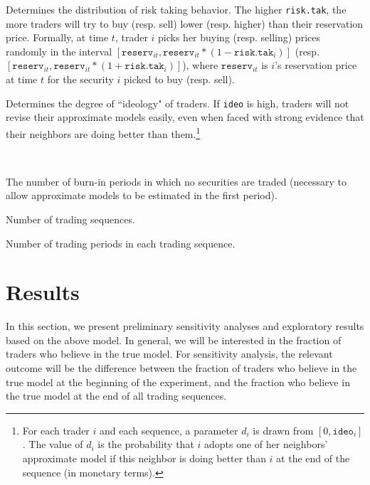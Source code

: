 \documentclass{sig-alternate}
\begin{document}
\begin{description}
\begin{description}
	\setlength\itemsep{0em}
	\item [\texttt{risk.tak}.] Determines the distribution of risk taking behavior. The higher \texttt{risk.tak}, the more traders	will try to buy (resp. sell) lower (resp. higher) than their reservation price. Formally, at time $t$, trader $i$ picks her buying (resp. selling) prices randomly in the interval  $[\texttt{reserv}_{it}, \allowbreak \texttt{reserv}_{it}  * (1 - \texttt{risk.tak}_i)]$ (resp. $[\texttt{reserv}_{it}, \allowbreak \texttt{reserv}_{it} * (1  + \texttt{risk.tak}_i)]$), where $\texttt{reserv}_{it}$ is $i$'s reservation price at time $t$ for the security $i$ picked to buy (resp. sell).
	\item [\texttt{ideo}.]  Determines the degree of ``ideology" of traders. If \texttt{ideo} is high, traders will not
	 revise their approximate models easily, even when faced with
	 strong evidence that their neighbors are doing better than them.\footnote{ For each trader $i$ and each sequence, a parameter $d_{i}$ is drawn from $[0, \texttt{ideo}_i]$. The value of $d_{i}$ is the probability that $i$ adopts one of her neighbors' approximate model if this neighbor is doing better than $i$ at the end of the sequence (in monetary terms).}
\end{description}	 
	
	\item[Timing parameters.]~
	
	\begin{description}
			\setlength\itemsep{0em}
		\item [\texttt{burn.in}.] The number of burn-in periods in which no securities are traded (necessary to allow approximate models to be estimated in the first period).
		\item [\texttt{n.seq}.] Number of trading sequences.
		\item [\texttt{horizon}.] Number of trading periods in each trading sequence.
	\end{description}

\end{description}

	\section{Results}
	
	\label{results}
	
In this section, we present preliminary sensitivity analyses and exploratory results based on the above model.  In general, we will be interested in the fraction of traders who believe in the true model. For sensitivity analysis, the relevant outcome will be the difference between the fraction of traders who believe in the true model at the beginning of the experiment, and the fraction who believe in the true model at the end of all trading sequences. 
\end{document}
